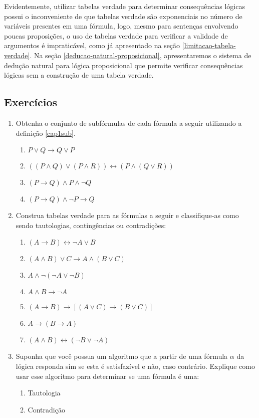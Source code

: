 Evidentemente, utilizar tabelas verdade para determinar
consequ\^encias l\'ogicas possui o inconveniente de que tabelas
verdade s\~ao exponenciais no n\'umero de vari\'aveis presentes em uma
f\'ormula, logo, mesmo para senten\c{c}as envolvendo poucas
proposi\c{c}\~oes, o uso de tabelas verdade para verificar a validade
de argumentos \'e impratic\'avel, como j\'a apresentado na se\c{c}\~ao
\ref{limitacao-tabela-verdade}. Na se\c{c}\~ao
\ref{deducao-natural-proposicional}, apresentaremos o sistema de
dedu\c{c}\~ao natural para l\'ogica proposicional que permite
verificar consequ\^encias l\'ogicas sem a constru\c{c}\~ao de uma
tabela verdade.

\subsection{Exerc\'icios}

\begin{enumerate}
        \item Obtenha o conjunto de subf\'ormulas de cada f\'ormula a
          seguir utilizando a defini\c{c}\~ao \ref{cap1sub}.
        \begin{enumerate}
           \item $P\lor Q \rightarrow Q \lor P$
           \item $((P\land Q)\lor (P\land R))\leftrightarrow(P\land (Q\lor R))$
           \item $(P\rightarrow Q) \land P\land \neg Q$
           \item $(P \rightarrow Q)\land \neg P \rightarrow Q$
        \end{enumerate}
	\item Construa tabelas verdade para as f\'ormulas a seguir e
          classifique-as como sendo tautologias, conting\^encias ou contradi\c{c}\~oes:
	\begin{enumerate}
		\item $(A\rightarrow B)\leftrightarrow\neg A\lor B$
		\item $(A\land B)\lor C\rightarrow A\land(B\lor C)$
		\item $A\land\neg (\neg A\lor \neg B)$
		\item $A\land B\rightarrow\neg A$
		\item $(A\rightarrow B)\rightarrow[(A\lor C)\rightarrow (B\lor C)]$
		\item $A\rightarrow(B\rightarrow A)$
		\item $(A\land B)\leftrightarrow(\neg B\lor \neg A)$
	\end{enumerate}
          \item Suponha que voc\^e possua um algoritmo que a partir de
            uma f\'ormula $\alpha$ da l\'ogica responda sim se esta
            \'e satisfaz\'ivel e não, caso contr\'ario. Explique
            como usar esse algoritmo para determinar se uma f\'ormula
            \'e uma:
            \begin{enumerate}
              \item Tautologia
              \item Contradi\c{c}\~ao
             \end{enumerate}
\end{enumerate}


